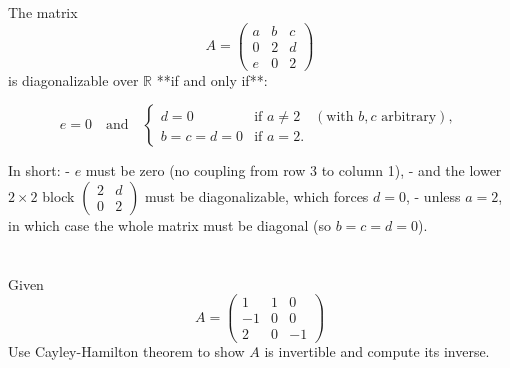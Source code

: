 \documentclass[12pt]{article}
\begin{document}
\begin{correctionbox}
The matrix 
\[
A = \begin{pmatrix}
a & b & c \\
0 & 2 & d \\
e & 0 & 2
\end{pmatrix}
\]
is diagonalizable over $\mathbb{R}$ **if and only if**:

\[
e = 0 \quad \text{and} \quad
\begin{cases}
d = 0 & \text{if } a \ne 2 \quad (\text{with } b,c \text{ arbitrary}), \\
b = c = d = 0 & \text{if } a = 2.
\end{cases}
\]

In short:  
- $e$ must be zero (no coupling from row 3 to column 1),  
- and the lower $2\times2$ block $\begin{pmatrix}2 & d\\0 & 2\end{pmatrix}$ must be diagonalizable, which forces $d = 0$,  
- unless $a = 2$, in which case the whole matrix must be diagonal (so $b = c = d = 0$).
\end{correctionbox}


\section{}
Given 
\[
A = \begin{pmatrix}
1 & 1 & 0 \\
-1 & 0 & 0 \\
2 & 0 & -1
\end{pmatrix}
\]
Use Cayley-Hamilton theorem to show \( A \) is invertible and compute its inverse.
\end{document}
